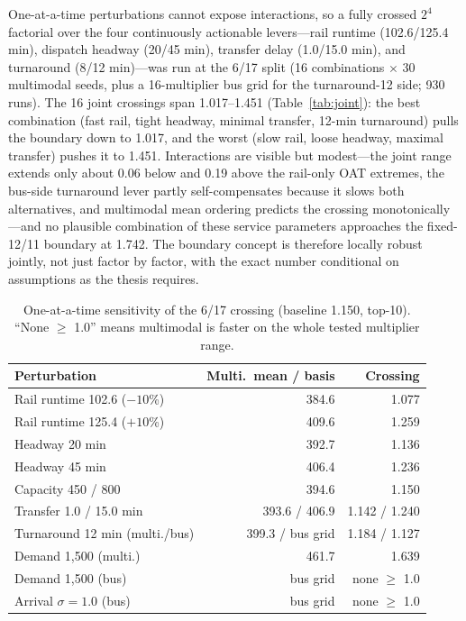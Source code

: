 \documentclass{ieeeaccess}
\begin{document}
One-at-a-time perturbations cannot expose interactions, so a fully crossed $2^4$ factorial over the four continuously actionable levers---rail runtime (102.6/125.4 min), dispatch headway (20/45 min), transfer delay (1.0/15.0 min), and turnaround (8/12 min)---was run at the 6/17 split (16 combinations $\times$ 30 multimodal seeds, plus a 16-multiplier bus grid for the turnaround-12 side; 930 runs). The 16 joint crossings span 1.017--1.451 (Table~\ref{tab:joint}): the best combination (fast rail, tight headway, minimal transfer, 12-min turnaround) pulls the boundary down to 1.017, and the worst (slow rail, loose headway, maximal transfer) pushes it to 1.451. Interactions are visible but modest---the joint range extends only about 0.06 below and 0.19 above the rail-only OAT extremes, the bus-side turnaround lever partly self-compensates because it slows both alternatives, and multimodal mean ordering predicts the crossing monotonically---and no plausible combination of these service parameters approaches the fixed-12/11 boundary at 1.742. The boundary concept is therefore locally robust jointly, not just factor by factor, with the exact number conditional on assumptions as the thesis requires.

\begin{table}[!t]
\caption{One-at-a-time sensitivity of the 6/17 crossing (baseline 1.150, top-10). ``None $\ge$ 1.0'' means multimodal is faster on the whole tested multiplier range.}
\label{tab:sens}
\centering
\footnotesize
\begin{tabular}{@{}lrr@{}}
\hline
Perturbation & Multi.\ mean / basis & Crossing \\
\hline
Rail runtime 102.6 ($-10$\%) & 384.6 & 1.077 \\
Rail runtime 125.4 ($+10$\%) & 409.6 & 1.259 \\
Headway 20 min & 392.7 & 1.136 \\
Headway 45 min & 406.4 & 1.236 \\
Capacity 450 / 800 & 394.6 & 1.150 \\
Transfer 1.0 / 15.0 min & 393.6 / 406.9 & 1.142 / 1.240 \\
Turnaround 12 min (multi./bus) & 399.3 / bus grid & 1.184 / 1.127 \\
Demand 1{,}500 (multi.) & 461.7 & 1.639 \\
Demand 1{,}500 (bus) & bus grid & none $\ge$ 1.0 \\
Arrival $\sigma=1.0$ (bus) & bus grid & none $\ge$ 1.0 \\
\hline
\end{tabular}
\end{table}
\end{document}
